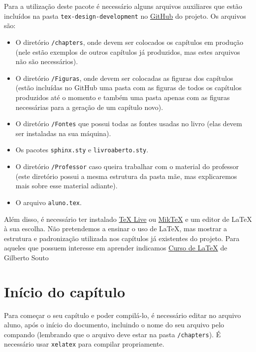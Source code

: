\mainmatter


Para a utilização deste pacote é necessário alguns arquivos auxiliares que estão incluídos na pasta \verb|tex-design-development| no \href{https://github.com/livro-aberto/tex-design-development/}{GitHub} do projeto. Os arquivos são:
\begin{itemize}
\item O diretório \verb|/chapters|, onde devem ser colocados os capítulos em produção (nele estão exemplos de outros capítulos já produzidos, mas estes arquivos não são necessários).
\item O diretório \verb|/Figuras|, onde devem ser colocadas as figuras dos capítulos (estão incluídas no GitHub uma pasta com as figuras de todos os capítulos produzidos até o momento e também uma pasta apenas com as figuras necessárias para a geração de um capítulo novo).
\item O diretório \verb|/Fontes| que possui todas as fontes usadas no livro (elas devem ser instaladas na sua máquina).
\item Os pacotes \verb|sphinx.sty| e \verb|livroaberto.sty|.
\item O diretório \verb|/Professor| caso queira trabalhar com o material do professor (este diretório possui a mesma estrutura da pasta mãe, mas explicaremos mais sobre esse material adiante).
\item O arquivo \verb|aluno.tex|.
\end{itemize}

Além disso, é necessário ter instalado \href{https://www.tug.org/texlive/}{\TeX{} Live} ou \href{https://miktex.org/}{Mik\TeX}{} e um editor de \LaTeX{} à sua escolha. Não pretendemos a ensinar o uso de \LaTeX, mas mostrar a estrutura e padronização utilizada nos capítulos já existentes do projeto. Para aqueles que possuem interesse em aprender indicamos \href{http://www.uft.edu.br/engambiental/prof/catalunha/arquivos/latex/latex_GilbertoSouto.pdf}{Curso de \LaTeX{}} de Gilberto Souto %



\section{Início do capítulo}

Para começar o seu capítulo e poder compilá-lo, é necessário editar no arquivo aluno, após o início do documento, incluindo o nome do seu arquivo pelo compando \verb||(lembrando que o arquivo deve estar na pasta \verb|/chapters|). É necessário usar \verb|xelatex| para compilar propriamente.

